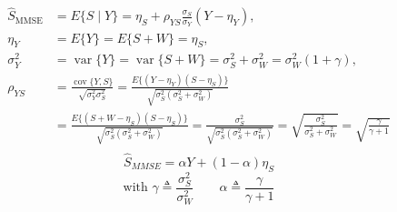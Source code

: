 \begin{itemize}
\begin{align*}
\hat{S}_{\text{MMSE}}
&= E\{S \mid Y\}
 = \eta_S + \rho_{YS}\frac{\sigma_S}{\sigma_Y}(Y-\eta_Y), \\[6pt]
\eta_Y &= E\{Y\} = E\{S+W\} = \eta_S, \\[4pt]
\sigma_Y^{2}
&= \operatorname{var}\{Y\}
 = \operatorname{var}\{S+W\}
 = \sigma_S^{2} + \sigma_W^{2}
 = \sigma_W^{2}(1+\gamma), \\[6pt]
\rho_{YS}
&= \frac{\operatorname{cov}\{Y,S\}}
        {\sqrt{\sigma_Y^{2}\sigma_S^{2}}}
 = \frac{E\{(Y-\eta_Y)(S-\eta_S)\}}
        {\sqrt{\sigma_S^{2}(\sigma_S^{2}+\sigma_W^{2})}} \\[4pt]
&= \frac{E\{(S+W-\eta_S)(S-\eta_S)\}}
        {\sqrt{\sigma_S^{2}(\sigma_S^{2}+\sigma_W^{2})}}
 = \frac{\sigma_S^{2}}
        {\sqrt{\sigma_S^{2}(\sigma_S^{2}+\sigma_W^{2})}}
 = \sqrt{\frac{\sigma_S^{2}}{\sigma_S^{2}+\sigma_W^{2}}}
 = \sqrt{\frac{\gamma}{\gamma+1}}\\
\end{align*}
\vspace{-1em}
\[\hat{S}_{MMSE}=\alpha Y+ (1-\alpha)\eta_S\]\vspace{-0.5em}
\[\text{with } \gamma \triangleq \dfrac{\sigma_S^{2}}{\sigma_W^{2}}\qquad \alpha\triangleq\frac{\gamma}{\gamma+1}\]


\end{itemize}
